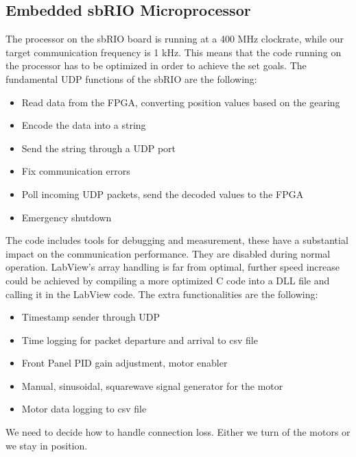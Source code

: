 \subsection{Embedded sbRIO Microprocessor}
\label{Embedded}

The processor on the sbRIO board is running at a 400 MHz clockrate, while our target communication frequency is 1 kHz. This means that the code running on the processor has to be optimized in order to achieve the set goals. The fundamental UDP functions of the sbRIO are the following:

\begin{itemize}
	\setlength\itemsep{0em}
	\item Read data from the FPGA, converting position values based on the gearing
	\item Encode the data into a string
	\item Send the string through a UDP port
	\item Fix communication errors
	\item Poll incoming UDP packets, send the decoded values to the FPGA
	\item Emergency shutdown	
\end{itemize}


The code includes tools for debugging and measurement, these have a substantial impact on the communication performance. They are disabled during normal operation. LabView's array handling is far from optimal, further speed increase could be achieved by compiling a more optimized C code into a DLL file and calling it in the LabView code. The extra functionalities are the following:

\begin{itemize}	
	\setlength\itemsep{0em}
	\item Timestamp sender through UDP
	\item Time logging for packet departure and arrival to csv file
	\item Front Panel PID gain adjustment, motor enabler
	\item Manual, sinusoidal, squarewave signal generator for the motor
	\item Motor data logging to csv file
	
\end{itemize}

We need to decide how to handle connection loss. Either we turn of the motors or we stay in position.

